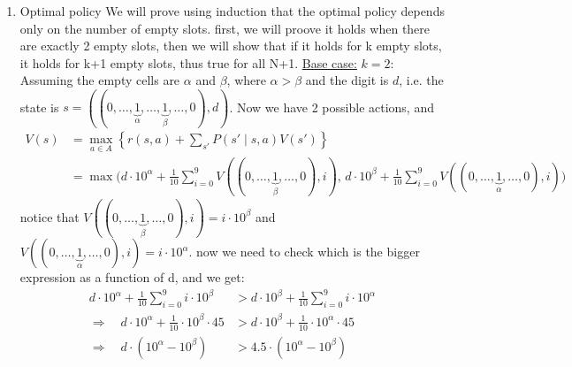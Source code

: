 \documentclass{assignmeownt}
\begin{document}
\begin{enumerate}
\begin{itemize}
\end{itemize} %

\item Optimal policy
\newline
We will prove using induction that the optimal policy depends only on the number of empty slots.
\newline
first, we will proove it holds when there are exactly 2 empty slots, then we will show that if it holds for k empty slots, it holds for k+1 empty slots, thus true for all N+1.
\newline
\underline{Base case:} $k=2$: Assuming the empty cells are $\alpha$ and $\beta$, where $\alpha > \beta$ and the digit is $d$, 
\newline i.e. the state is $s=((0, \dots, \underbrace{1}_{{\alpha}}, \dots, \underbrace{1}_{{\beta}}, \dots, 0), d)$. Now we have 2 possible actions, and \newline
\begin{equation}
    \begin{aligned}
        V(s) &= \max_{a \in A} \left\{ r(s, a) + \sum_{s'} P(s' \mid s, a) V(s') \right\} \\
        &= \max \Biggl( d \cdot 10^{\alpha} + \frac{1}{10} \sum_{i=0}^{9} V((0, \dots, \underbrace{1}_{\beta}, \dots, 0), i), \,
        d \cdot 10^{\beta} + \frac{1}{10} \sum_{i=0}^{9} V((0, \dots, \underbrace{1}_{\alpha}, \dots, 0), i) \Biggr)
    \end{aligned}
\end{equation}
\newline
notice that $ V((0, \dots, \underbrace{1}_{\beta}, \dots, 0), i) = i \cdot 10^{\beta} $ and $ V((0, \dots, \underbrace{1}_{\alpha
}, \dots, 0), i) = i \cdot 10^{\alpha} $.
\newline
now we need to check which is the bigger expression as a function of d, and we get:
\newline
\begin{equation}
    \begin{aligned}
        d \cdot 10^{\alpha} + \frac{1}{10} \sum_{i=0}^{9} i \cdot 10^{\beta} &> d \cdot 10^{\beta} + \frac{1}{10} \sum_{i=0}^{9} i \cdot 10^{\alpha} \\
        \Rightarrow \quad d \cdot 10^{\alpha} + \frac{1}{10} \cdot 10^{\beta} \cdot 45 &> d \cdot 10^{\beta} + \frac{1}{10} \cdot 10^{\alpha} \cdot 45 \\
        \Rightarrow \quad d \cdot (10^{\alpha} - 10^{\beta}) &> 4.5 \cdot (10^{\alpha} - 10^{\beta}) \\

\end{aligned}
\end{equation}
\end{enumerate}
\end{document}
